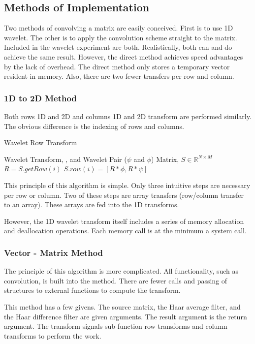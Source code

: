 \subsection{Methods of Implementation}
Two methods of convolving a matrix are easily conceived.  First is to
use 1D wavelet.  The other is to apply the convolution scheme
straight to the matrix. Included in the wavelet experiment are both.
Realistically, both can and do achieve the same result.  However, the
direct method achieves speed advantages by the lack of overhead.  The
direct method only stores a temporary vector resident in memory.  Also,
there are two fewer transfers per row and column.

\subsubsection{1D to 2D Method}

Both rows 1D and 2D and columns 1D and 2D transform are performed
similarly.  The obvious difference is the indexing of rows and
columns.

\begin{algorithm}
\caption{Wavelet Row Transform}
\begin{algorithmic}
\REQUIRE Wavelet Transform, , and Wavelet Pair ($\psi$ and $\phi$)
\REQUIRE Matrix, $S \in {\mathbb R}^{N\times M}$
\STATE $R = S.getRow(i)$
\STATE $S.row(i) = \left[ R \ast \phi, R \ast \psi \right]$
\ENDFOR
\end{algorithmic}
\end{algorithm}

This principle of this algorithm is simple.  Only three intuitive steps are necessary per row or column.  Two of these steps are array transfers (row/column transfer to an array).  These arrays are fed into the 1D transforms.  

However, the 1D wavelet transform itself includes a series of memory allocation and deallocation operations.  Each memory call is at the minimum a system call.  

\subsubsection {Vector - Matrix Method}
The principle of this algorithm is more complicated.  All functionality, such as convolution, is built into the method.  There are fewer calls and passing of structures to external functions to compute the transform.  

This method has a few givens.  The source matrix, the Haar average filter, and the Haar difference filter are given arguments.  The result argument is the return argument.    The transform signals sub-function row transforms and column transforms to perform the work.  

